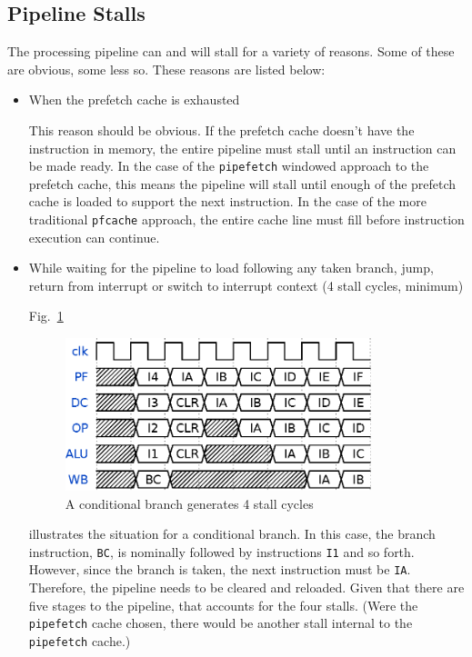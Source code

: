 \documentclass{gqtekspec}
\begin{document}

\subsection{Pipeline Stalls}
The processing pipeline can and will stall for a variety of reasons.  Some of
these are obvious, some less so.  These reasons are listed below:
\begin{itemize}
\item When the prefetch cache is exhausted

This reason should be obvious.  If the prefetch cache doesn't have the
instruction in memory, the entire pipeline must stall until an instruction
can be made ready.  In the case of the {\tt pipefetch} windowed approach
to the prefetch cache, this means the pipeline will stall until enough of the
prefetch cache is loaded to support the next instruction.  In the case
of the more traditional {\tt pfcache} approach, the entire cache line must
fill before instruction execution can continue.

\item While waiting for the pipeline to load following any taken branch, jump,
	return from interrupt or switch to interrupt context (4 stall cycles,
	minimum)

Fig.~\ref{fig:bcstalls}
\begin{figure}\begin{center}
\includegraphics[width=3.5in]{../gfx/bc.eps}
\caption{A conditional branch generates 4 stall cycles}\label{fig:bcstalls}
\end{center}\end{figure}
illustrates the situation for a conditional branch.  In this case, the branch
instruction, {\tt BC}, is nominally followed by instructions {\tt I1} and so
forth.  However, since the branch is taken, the next instruction must be
{\tt IA}.  Therefore, the pipeline needs to be cleared and reloaded.
Given that there are five stages to the pipeline, that accounts
for the four stalls.  (Were the {\tt pipefetch} cache chosen, there would
be another stall internal to the {\tt pipefetch} cache.)


\end{itemize}
\end{document}
